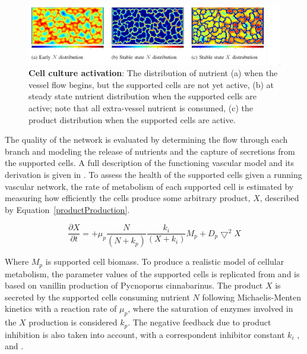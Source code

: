 \begin{figure}[ht]
 \begin{center}
  \includegraphics[width=\textwidth]{./figures/Figure7.JPG}
 \end{center}
  \caption{\textbf{Cell culture activation}: The distribution of nutrient (a) when the vessel flow begins, but the supported cells are not yet active, (b) at steady state nutrient distribution when the supported cells are active; note that all extra-vessel nutrient is consumed, (c) the product distribution when the supported cells are active.}
 \vspace{+1mm}
\label{runningFactory}
\end{figure}

The quality of the network is evaluated by determining the flow through each branch and modeling the release of nutrients and the capture of secretions from the supported cells. A full description of the functioning vascular model and its derivation is given in \cite{Davis2017Exploiting}. To assess the health of the supported cells given a running vascular network, the rate of metabolism of each supported cell is estimated by measuring how efficiently the cells produce some arbitrary product, $X$, described by Equation~\ref{productProduction}.

\begin{equation}
\frac{\partial X}{\partial t}=+\mu _{p}  \frac{N}{(N+k_p)} \frac{k_i}{(X+k_i)} M_p + D_{p}\bigtriangledown^{2} X
\label{productProduction}
\end{equation}

Where $M_p$ is supported cell biomass. To produce a realistic model of cellular metabolism, the parameter values of the supported cells is replicated from \cite{delindavis:Bernard1999Mass} and is based on vanillin production of Pycnoporus cinnabarinus. The product $X$ is secreted by the supported cells consuming nutrient $N$ following Michaelis-Menten kinetics with a reaction rate of $\mu _{p}$, where the saturation of enzymes involved in the $X$ production is considered $k_p$. The negative feedback due to product inhibition is also taken into account, with a correspondent inhibitor constant $k_i$ \cite{Han1988Extended}, \cite{Levenspiel1980Monod} and \cite{Aiba1968Kinetics}.

